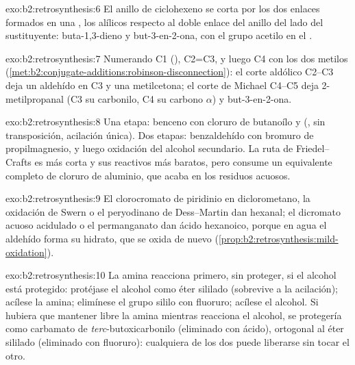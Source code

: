 \begin{solution}{exo:b2:retrosynthesis:6}
El anillo de ciclohexeno se corta por los dos enlaces  formados en una , los
alílicos respecto al doble enlace del anillo del lado del sustituyente: buta-1,3-dieno y but-3-en-2-ona, con el
grupo acetilo en el .
\end{solution}

\begin{solution}{exo:b2:retrosynthesis:7}
Numerando C1 (), C2=C3, y luego C4 con los dos metilos
(\cref{met:b2:conjugate-additions:robinson-disconnection}): el corte aldólico C2--C3 deja un aldehído
en C3 y una metilcetona; el corte de Michael C4--C5 deja 2-metilpropanal (C3 su carbonilo, C4 su
carbono $\alpha$) y but-3-en-2-ona.
\end{solution}

\begin{solution}{exo:b2:retrosynthesis:8}
Una etapa: benceno con cloruro de butanoílo y  (, sin transposición,
acilación única). Dos etapas: benzaldehído con bromuro de propilmagnesio, y luego oxidación del alcohol
secundario. La ruta de Friedel--Crafts es más corta y sus reactivos más baratos, pero consume un equivalente completo de
cloruro de aluminio, que acaba en los residuos acuosos.
\end{solution}

\begin{solution}{exo:b2:retrosynthesis:9}
El clorocromato de piridinio en diclorometano, la oxidación de Swern o el peryodinano de Dess--Martin
dan hexanal; el dicromato acuoso acidulado o el permanganato dan ácido hexanoico, porque en agua el
aldehído forma su hidrato, que se oxida de nuevo (\cref{prop:b2:retrosynthesis:mild-oxidation}).
\end{solution}

\begin{solution}{exo:b2:retrosynthesis:10}
La amina reacciona primero, sin proteger, si el alcohol está protegido: protéjase el alcohol como éter sililado
(sobrevive a la acilación); acílese la amina; elimínese el grupo sililo con fluoruro; acílese el
alcohol. Si hubiera que mantener libre la amina mientras reacciona el alcohol, se protegería como
carbamato de \textit{terc}-butoxicarbonilo (eliminado con ácido), ortogonal al éter sililado (eliminado con
fluoruro): cualquiera de los dos puede liberarse sin tocar el otro.
\end{solution}

